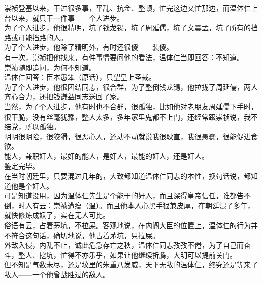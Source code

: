 \begin{multicols}{\theparacolNo}
崇祯登基以来，干过很多事，平乱、抗金、整顿，忙完这边又忙那边，而温体仁上台以来，就只干一件事——个人进步。\\

为了个人进步，他很精明，坑了钱龙锡，坑了周延儒，坑了文震孟，坑了所有的挡路或可能挡路的人。\\

为了个人进步，他除了精明外，有时还很傻——装傻。\\

有一次，崇祯把他找来，有件事情要问他的看法，温体仁当即回答：不知道。\\

崇祯随即追问，为何不知道。\\

温体仁回答：臣本愚笨（原话），只望皇上圣裁。\\

为了个人进步，他很团结同志，很合群，为了整倒钱龙锡，他拉拢了周延儒，两人齐心合力，还把钱谦益同志送回了家。\\

当然，为了个人进步，他有时也不合群，很孤独，比如他对老朋友周延儒下手时，很干脆，没有丝毫犹豫，整人太多，多年家里鬼都不上门，还经常跟崇祯说，我不结党，所以孤独。\\

明明很阴险，很狡猾，很恶心人，还动不动就说我很耿直，我很愚蠢，很能促进食欲。\\

能人，兼职奸人，最奸的能人，是奸人，最能的奸人，还是奸人。\\

鉴定完毕。\\

在当时朝廷里，只要混过几年的，大致都知道温体仁同志的本性，换句话说，都知道他是个奸人。\\

可是知道没用，因为温体仁先生是个能干的奸人，而且深得皇帝信任，谁都告不倒，时人有云：崇祯遭瘟（温）。而且他本人心黑手狠兼皮厚，在朝廷混了多年，就快修炼成妖了，实在无人可比。\\

俗语有云，占着茅坑，不拉屎。客观地说，在内阁大臣的位置上，温体仁的行为并不符合这句话，确切地说，他占着茅坑，只拉屎。\\

外敌入侵，内乱不止，诚此危急存亡之秋，温体仁同志孜孜不倦，为了自己而奋斗，整人、挖坑，忙得不亦乐乎，如果让他继续折腾，大明可以提前关门。\\

但不知是气数未尽，还是坟里的朱重八发威，天下无敌的温体仁，终究还是等来了敌人——一个他曾战胜过的敌人。\\


\end{multicols}
